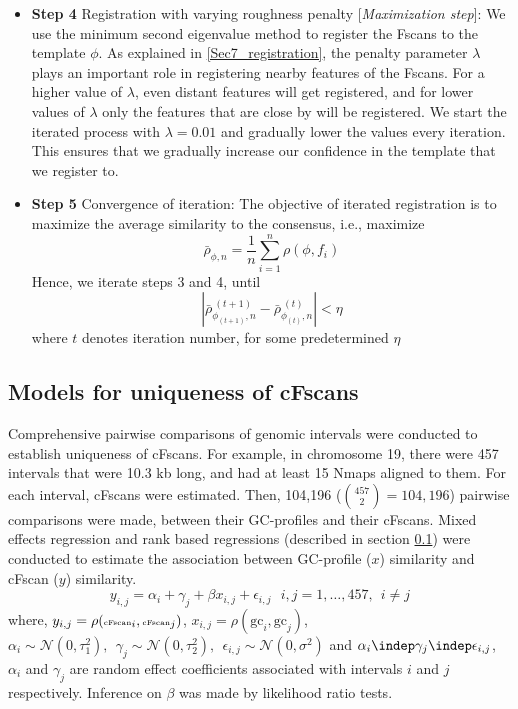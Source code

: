 \begin{itemize}
\item {\bf{Step 4}} Registration with varying roughness penalty [{\emph{Maximization step}}]: We use the minimum second eigenvalue method to register the Fscans to the template $\phi$. As explained in \ref{Sec7_registration}, the penalty parameter $\lambda$ plays an important role in registering nearby features of the Fscans. For a higher value of $\lambda$, even distant features will get registered, and for lower values of $\lambda$ only the features that are close by will be registered. We start the iterated process with $\lambda = 0.01$ and gradually lower the values every iteration. This ensures that we gradually increase our confidence in the template that we register to. \\
\item {\bf{Step 5}} Convergence of iteration: The objective of iterated registration is to maximize the average similarity to the consensus, i.e., maximize 
\[ \bar{\rho}_{\phi, n} = \frac{1}{n} \sum \limits_{i = 1}^{n} \rho(\phi, f_i)\]
Hence, we iterate steps 3 and 4, until
\[ |\bar{\rho}_{\phi_{(t+1)}, n}^{\ (t+1)} - \bar{\rho}_{\phi_{(t)}, n}^{ \ (t)} | < \eta \]
where $t$ denotes iteration number, for some predetermined $\eta$
\end{itemize}

\subsection{Models for uniqueness of cFscans} \label{Sec4_Uniqueness}
Comprehensive pairwise comparisons of genomic intervals were conducted to establish uniqueness of cFscans. For example, in chromosome 19, there were 457 intervals that were 10.3 kb long, and had at least 15 Nmaps aligned to them. For each interval, cFscans were estimated. Then, 104,196 ($ \binom {457} {2} = 104,196 $) pairwise comparisons were made, between their GC-profiles and their cFscans. Mixed effects regression and rank based regressions (described in section \ref{Sec4_Uniqueness}) were conducted to estimate the association between GC-profile ($x$) similarity and cFscan ($y$) similarity. 
\begin{equation}
y_{i,j} = \alpha_i + \gamma_j + \beta x_{i,j} + \epsilon_{i,j}\ \ \ i, j = 1, \dots, 457,\ \ i \ne j
\end{equation}
where, $y_{i,j} = \rho(\text{\tiny{cFscan}}_i, \text{\tiny{cFscan}}_j)$, $x_{i,j} = \rho(\text{gc}_i, \text{gc}_j)$, $\alpha_i \sim \mathcal{N}(0, \tau_1^2), \ \ \gamma_j \sim \mathcal{N}(0, \tau_2^2), \ \ \epsilon_{i,j} \sim \mathcal{N}(0, \sigma^2)$ and $\alpha_i \indep \gamma_j \indep \epsilon_{i,j}$, $\alpha_i$ and $\gamma_j$ are random effect coefficients associated with intervals $i$ and $j$ respectively. Inference on $\beta$ was made by likelihood ratio tests. 

